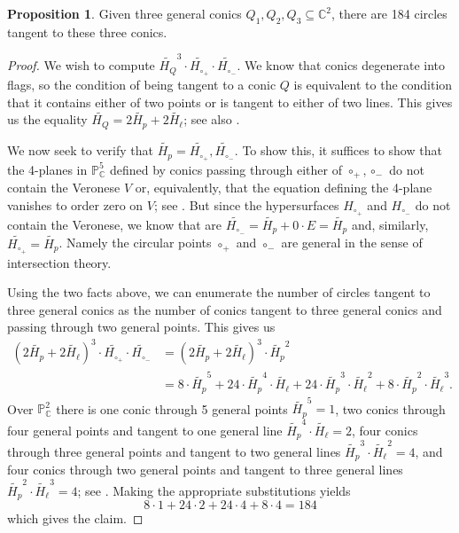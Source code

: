 \documentclass[12pt]{amsart}
\theoremstyle{definition}
\theoremstyle{definition}
\newtheorem{prop}[thm]{Proposition}
\numberwithin{equation}{section}
\begin{document}
\begin{prop}\label{thm_main}
Given three general conics $Q_1,Q_2,Q_3 \subseteq \mathbb{C}^2$, there are 184 circles tangent to these three conics.
\end{prop}
\begin{proof}
We wish to compute $\widetilde{H_{Q}}^{3}\cdot\widetilde{H_{\circ_{+}}}\cdot\widetilde{H_{\circ_{-}}}$. We know that conics degenerate into flags, so the condition of being tangent to a conic $Q$ is equivalent to the condition that it contains either of two points or is tangent to either of two lines. This gives us the equality $\widetilde{H_{Q}}=2\widetilde{H_{p}}+2\widetilde{H_{\ell}}$; see also \cite[p.\ 775]{PrinciplesAG}.

We now seek to verify that 
$\widetilde{H_{p}}=\widetilde{H_{\circ_{+}}}, \widetilde{H_{\circ_{-}}}$. To show this, it suffices to show that the 4-planes in $\mathbb{P}^{5}_{\mathbb{C}}$ defined by conics passing through either of $\circ_{+},\circ_{-}$ do not contain the Veronese $V$ or, equivalently, that the equation defining the 4-plane vanishes to order zero on $V$; see \cite[p.\ 105]{CommAlg}. But since the hypersurfaces $H_{\circ_{+}}$ and $H_{\circ_{-}}$ do not contain the Veronese, we know that are $\widetilde{H_{\circ_{-}}}=\widetilde{H_{p}}+0\cdot E=\widetilde{H_{p}}$ and, similarly, $\widetilde{H_{\circ_{+}}} = \widetilde{H_{p}}$. Namely the circular points $\circ_{+}$ and $\circ_{-}$ are general in the sense of intersection theory.


Using the two facts above, we can enumerate the number of circles tangent to three general conics as the number of conics tangent to three general conics and passing through two general points. This gives us
\begin{align*}
    (2\widetilde{H_{p}}+2\widetilde{H_{\ell}})^{3}\cdot\widetilde{H_{\circ_{+}}}\cdot\widetilde{H_{\circ_{-}}} & = (2\widetilde{H_{p}}+2\widetilde{H_{\ell}})^{3}\cdot\widetilde{H_{p}}^{2} \\
    &= 8\cdot\widetilde{H_{p}}^{5} + 24\cdot\widetilde{H_{p}}^{4}\cdot\widetilde{H_{\ell}} + 24\cdot\widetilde{H_{p}}^{3}\cdot\widetilde{H_{\ell}}^{2} + 8\cdot\widetilde{H_{p}}^{2}\cdot\widetilde{H_{\ell}}^{3}. 
\end{align*}
Over $\mathbb{P}^{2}_{\mathbb{C}}$ there is one conic through 5 general points $\widetilde{H_{p}}^{5}=1$,  two conics through four general points and tangent to one general line $\widetilde{H_{p}}^{4}\cdot\widetilde{H_{\ell}}=2$, four conics through three general points and tangent to two general lines $\widetilde{H_{p}}^{3}\cdot\widetilde{H_{\ell}}^{2}=4$, and four conics through two general points and tangent to three general lines $\widetilde{H_{p}}^{2}\cdot\widetilde{H_{\ell}}^{3}=4$; see \cite[p.\ 307]{3264AllThat}. 
Making the appropriate substitutions yields 
$$8\cdot 1 + 24\cdot 2 + 24\cdot 4 + 8\cdot 4=184$$
which gives the claim. 
\end{proof}
\end{document}
